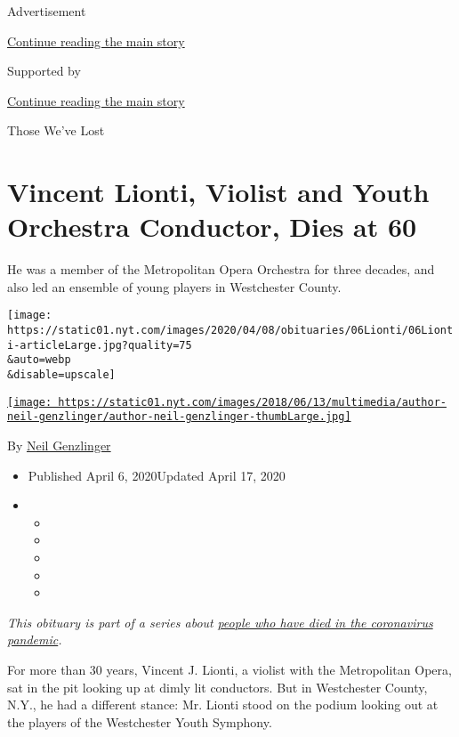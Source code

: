 Advertisement

\protect\hyperlink{after-top}{Continue reading the main story}

Supported by

\protect\hyperlink{after-sponsor}{Continue reading the main story}

Those We've Lost

\hypertarget{vincent-lionti-violist-and-youth-orchestra-conductor-dies-at-60}{%
\section{Vincent Lionti, Violist and Youth Orchestra Conductor, Dies at
60}\label{vincent-lionti-violist-and-youth-orchestra-conductor-dies-at-60}}

He was a member of the Metropolitan Opera Orchestra for three decades,
and also led an ensemble of young players in Westchester County.

\texttt{[image: https://static01.nyt.com/images/2020/04/08/obituaries/06Lionti/06Lionti-articleLarge.jpg?quality=75\\\&auto=webp\\\&disable=upscale]}

\href{https://www.nytimes.com/by/neil-genzlinger}{\texttt{[image: https://static01.nyt.com/images/2018/06/13/multimedia/author-neil-genzlinger/author-neil-genzlinger-thumbLarge.jpg]}}

By \href{https://www.nytimes.com/by/neil-genzlinger}{Neil Genzlinger}

\begin{itemize}
\item
  Published April 6, 2020Updated April 17, 2020
\item
  \begin{itemize}
  \item
  \item
  \item
  \item
  \item
  \end{itemize}
\end{itemize}

\emph{This obituary is part of a series about}
\href{https://www.nytimes.com/series/people-who-have-died-of-the-coronavirus}{\emph{people
who have died in the coronavirus pandemic}}\emph{.}

For more than 30 years, Vincent J. Lionti, a violist with the
Metropolitan Opera, sat in the pit looking up at dimly lit conductors.
But in Westchester County, N.Y., he had a different stance: Mr. Lionti
stood on the podium looking out at the players of the Westchester Youth
Symphony.

